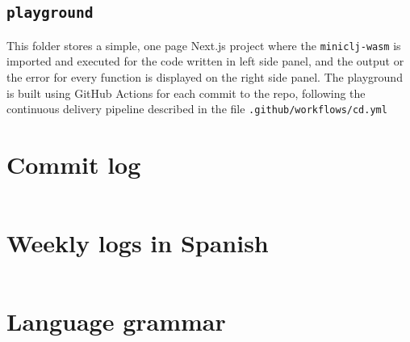 \documentclass[11pt]{scrreprt}
\begin{document}
\section{\texttt{playground}}
This folder stores a simple, one page Next.js project where the \texttt{miniclj-wasm} is imported and executed for the code written in left side panel, and the output or the error for every function is displayed on the right side panel. The playground is built using GitHub Actions for each commit to the repo, following the continuous delivery pipeline described in the file \texttt{.github/workflows/cd.yml}


\appendix

\chapter{Commit log}
\label{apdx:commits}
\inputminted{text}{/home/mario/git/MarioJim/miniclj/docs/commits.txt}

\chapter{Weekly logs in Spanish}
\label{apdx:weeklylogs}
\inputminted[breaklines=true]{md}{/home/mario/git/MarioJim/miniclj/docs/logs.md}

\chapter{Language grammar}
\label{apdx:grammar}
\inputminted{rust}{/home/mario/git/MarioJim/miniclj/miniclj-lib/src/lispparser.lalrpop}
\end{document}
